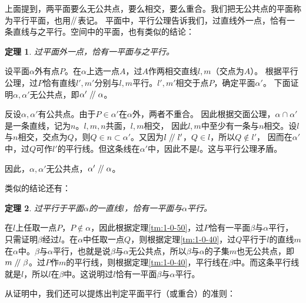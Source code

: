 \documentclass[12pt,UTF8]{ctexbook}
\newtheorem{tm}{定理}[section]
\renewcommand\parallel{\mathrel{/\mskip-4mu/}}
\begin{document}
上面提到，两平面要么无公共点，要么相交，要么重合。我们把无公共点的平面称为平行平面，也用$\parallel$表记。
平面中，平行公理告诉我们，过直线外一点，恰有一条直线与之平行。空间中的平面，也有类似的结论：
\begin{tm}
    过平面外一点，恰有一平面与之平行。
\end{tm}\label{tm:1-0-50}
\begin{proof2}
    设平面$\alpha$外有点$P$。在$\alpha$上选一点$A$，过$A$作两相交直线$l,m$（交点为$A$）。
    根据平行公理，过$P$恰有直线$l', m'$分别与$l,m$平行。$l',m'$相交于点$P$，确定平面$\alpha'$。
    下面证明$\alpha,\alpha'$无公共点，即$\alpha'\parallel\alpha$。

    反设$\alpha,\alpha'$有公共点。由于$P\in\alpha'$在$\alpha$外，两者不重合。
    因此根据交面公理，$\alpha \cap \alpha'$是一条直线，记为$n$。$l,m,n$共面，$l,m$相交，
    因此$l,m$中至少有一条与$n$相交。设$l$与$n$相交，交点为$Q$，则$Q\in n\subset\alpha'$。又因为$l\parallel l'$，$Q\in l$，所以$Q\notin l'$，
    因而在$\alpha'$中，过$Q$可作$l'$的平行线。但这条线在$\alpha'$中，因此不是$l$。这与平行公理矛盾。
        
    因此，$\alpha,\alpha'$无公共点，$\alpha'\parallel\alpha$。
\end{proof2}

类似的结论还有：

\begin{tm}\label{tm:1-0-60}
    过平行于平面$\alpha$的一直线$l$，恰有一平面与$\alpha$平行。
\end{tm}
\begin{proof2}
在$l$上任取一点$P$，$P\notin \alpha$，因此根据定理\ref{tm:1-0-50}，过$P$恰有一平面$\beta$与$\alpha$平行，只需证明$\beta$经过$l$。在$\alpha$中任取一点$Q$，则根据定理\ref{tm:1-0-40}，过$Q$平行于$l$的直线$m$在$\alpha$中。$\beta$与$\alpha$平行，也就是说$\beta$与$\alpha$无公共点，所以$\beta$与$\alpha$的子集$m$也无公共点，即$m\parallel \beta$。过$P$作$m$的平行线，则根据定理\ref{tm:1-0-40}，平行线在$\beta$中。而这条平行线就是$l$，所以$l$在$\beta$中。这说明过$l$恰有一平面$\beta$与$\alpha$平行。
\end{proof2}

从证明中，我们还可以提炼出判定平面平行（或重合）的准则：
\end{document}
